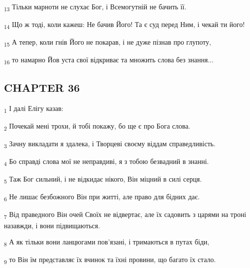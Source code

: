 \begin{tcolorbox}
\textsubscript{13} Тільки марноти не слухає Бог, і Всемогутній не бачить її.
\end{tcolorbox}
\begin{tcolorbox}
\textsubscript{14} Що ж тоді, коли кажеш: Не бачив Його! Та є суд перед Ним, і чекай ти його!
\end{tcolorbox}
\begin{tcolorbox}
\textsubscript{15} А тепер, коли гнів Його не покарав, і не дуже пізнав про глупоту,
\end{tcolorbox}
\begin{tcolorbox}
\textsubscript{16} то намарно Йов уста свої відкриває та множить слова без знання...
\end{tcolorbox}
\subsection{CHAPTER 36}
\begin{tcolorbox}
\textsubscript{1} І далі Елігу казав:
\end{tcolorbox}
\begin{tcolorbox}
\textsubscript{2} Почекай мені трохи, й тобі покажу, бо ще є про Бога слова.
\end{tcolorbox}
\begin{tcolorbox}
\textsubscript{3} Зачну викладати я здалека, і Творцеві своєму віддам справедливість.
\end{tcolorbox}
\begin{tcolorbox}
\textsubscript{4} Бо справді слова мої не неправдиві, я з тобою безвадний в знанні.
\end{tcolorbox}
\begin{tcolorbox}
\textsubscript{5} Таж Бог сильний, і не відкидає нікого, Він міцний в силі серця.
\end{tcolorbox}
\begin{tcolorbox}
\textsubscript{6} Не лишає безбожного Він при житті, але право для бідних дає.
\end{tcolorbox}
\begin{tcolorbox}
\textsubscript{7} Від праведного Він очей Своїх не відвертає, але їх садовить з царями на троні назавжди, і вони підвищаються.
\end{tcolorbox}
\begin{tcolorbox}
\textsubscript{8} А як тільки вони ланцюгами пов'язані, і тримаються в путах біди,
\end{tcolorbox}
\begin{tcolorbox}
\textsubscript{9} то Він їм представляє їх вчинок та їхні провини, що багато їх стало.
\end{tcolorbox}
